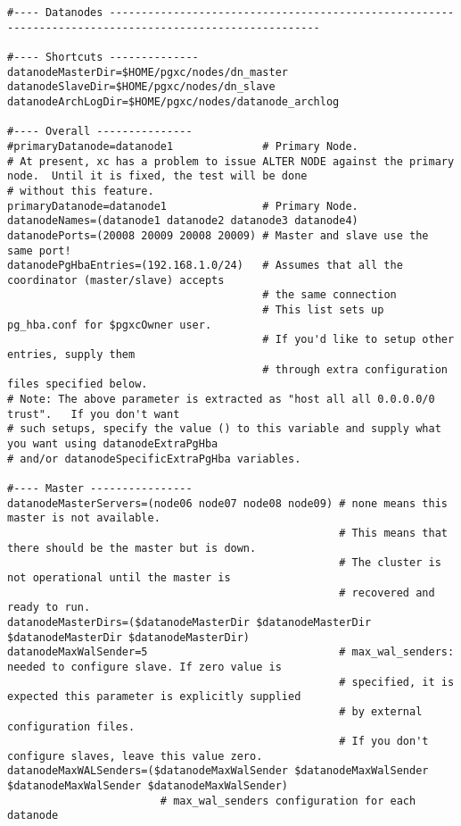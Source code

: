   \begin{lstlisting}[frame=single, basicstyle=\ttfamily\tiny]
#---- Datanodes -------------------------------------------------------------------------------------------------------

#---- Shortcuts --------------
datanodeMasterDir=$HOME/pgxc/nodes/dn_master
datanodeSlaveDir=$HOME/pgxc/nodes/dn_slave
datanodeArchLogDir=$HOME/pgxc/nodes/datanode_archlog

#---- Overall ---------------
#primaryDatanode=datanode1              # Primary Node.
# At present, xc has a problem to issue ALTER NODE against the primary node.  Until it is fixed, the test will be done
# without this feature.
primaryDatanode=datanode1               # Primary Node.
datanodeNames=(datanode1 datanode2 datanode3 datanode4)
datanodePorts=(20008 20009 20008 20009) # Master and slave use the same port!
datanodePgHbaEntries=(192.168.1.0/24)   # Assumes that all the coordinator (master/slave) accepts
                                        # the same connection
                                        # This list sets up pg_hba.conf for $pgxcOwner user.
                                        # If you'd like to setup other entries, supply them
                                        # through extra configuration files specified below.
# Note: The above parameter is extracted as "host all all 0.0.0.0/0 trust".   If you don't want
# such setups, specify the value () to this variable and supply what you want using datanodeExtraPgHba
# and/or datanodeSpecificExtraPgHba variables.

#---- Master ----------------
datanodeMasterServers=(node06 node07 node08 node09) # none means this master is not available.
                                                    # This means that there should be the master but is down.
                                                    # The cluster is not operational until the master is
                                                    # recovered and ready to run.   
datanodeMasterDirs=($datanodeMasterDir $datanodeMasterDir $datanodeMasterDir $datanodeMasterDir)
datanodeMaxWalSender=5                              # max_wal_senders: needed to configure slave. If zero value is 
                                                    # specified, it is expected this parameter is explicitly supplied
                                                    # by external configuration files.
                                                    # If you don't configure slaves, leave this value zero.
datanodeMaxWALSenders=($datanodeMaxWalSender $datanodeMaxWalSender $datanodeMaxWalSender $datanodeMaxWalSender)
                        # max_wal_senders configuration for each datanode


\end{lstlisting}
